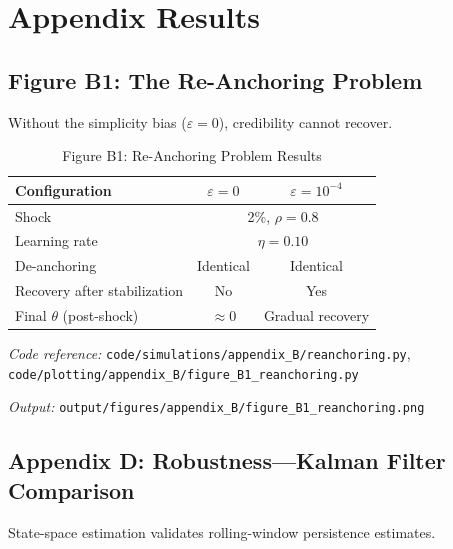 \documentclass[11pt]{article}
\begin{document}
\section{Appendix Results}
\label{sec:appendix_results}

\subsection{Figure B1: The Re-Anchoring Problem}

Without the simplicity bias ($\varepsilon = 0$), credibility cannot recover.

\begin{table}[htbp]
\centering
\caption{Figure B1: Re-Anchoring Problem Results}
\label{tab:reanchoring}
\begin{threeparttable}
\begin{tabular}{lcc}
\toprule
Configuration & $\varepsilon = 0$ & $\varepsilon = 10^{-4}$ \\
\midrule
Shock & \multicolumn{2}{c}{2\%, $\rho = 0.8$} \\
Learning rate & \multicolumn{2}{c}{$\eta = 0.10$} \\
\midrule
De-anchoring & Identical & Identical \\
Recovery after stabilization & No & Yes \\
Final $\theta$ (post-shock) & $\approx 0$ & Gradual recovery \\
\bottomrule
\end{tabular}
\begin{tablenotes}
\small
\item \textit{Code reference:} \texttt{code/simulations/appendix\_B/reanchoring.py}, \texttt{code/plotting/appendix\_B/figure\_B1\_reanchoring.py}
\item \textit{Output:} \texttt{output/figures/appendix\_B/figure\_B1\_reanchoring.png}
\end{tablenotes}
\end{threeparttable}
\end{table}

\subsection{Appendix D: Robustness---Kalman Filter Comparison}

State-space estimation validates rolling-window persistence estimates.
\end{document}
